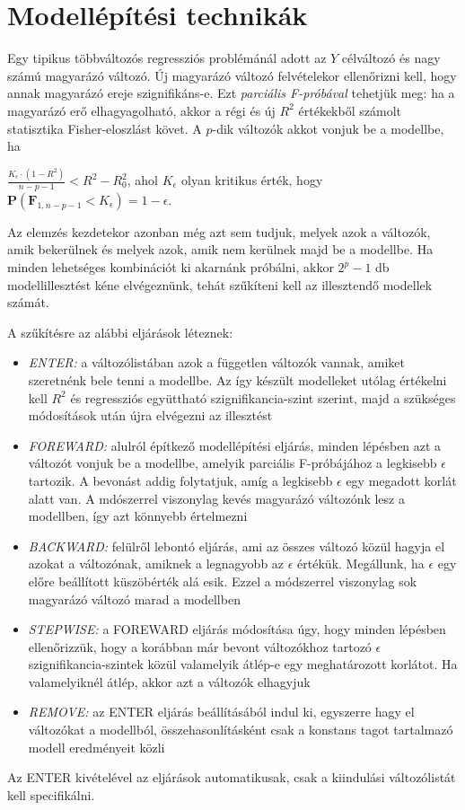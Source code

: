 \section{Modellépítési technikák}

Egy tipikus többváltozós regressziós problémánál adott az $Y$ célváltozó és nagy számú magyarázó változó. Új magyarázó változó felvételekor ellenőrizni kell, hogy annak magyarázó ereje szignifikáns-e. Ezt \emph{parciális F-próbával} tehetjük meg: ha a magyarázó erő elhagyagolható, akkor a régi és új $R^2$ értékekből számolt statisztika Fisher-eloszlást követ. A $p$-dik változók akkot vonjuk be a modellbe, ha

$\frac{K_\epsilon \cdot (1-R^2)}{n-p-1} < R^2 -R_0^2$, ahol $K_\epsilon$ olyan kritikus érték, hogy $\mathbf{P}(\mathbf{F}_{1,n-p-1} < K_\epsilon) = 1-\epsilon$.

Az elemzés kezdetekor azonban még azt sem tudjuk, melyek azok a változók, amik bekerülnek és melyek azok, amik nem kerülnek majd be a modellbe. Ha minden lehetséges kombinációt ki akarnánk próbálni, akkor $2^p-1$ db modellillesztést kéne elvégeznünk, tehát szűkíteni kell az illesztendő modellek számát.

A szűkítésre az alábbi eljárások léteznek:
\begin{itemize}
\item \emph{ENTER:} a változólistában azok a független változók vannak, amiket szeretnénk bele tenni a modellbe. Az így készült modelleket utólag értékelni kell $R^2$ és regressziós együttható szignifikancia-szint szerint, majd a szükséges módosítások után újra elvégezni az illesztést
\item \emph{FOREWARD:} alulról építkező modellépítési eljárás, minden lépésben azt a változót vonjuk be a modellbe, amelyik parciális F-próbájához a legkisebb $\epsilon$ tartozik. A bevonást addig folytatjuk, amíg a legkisebb $\epsilon$ egy megadott korlát alatt van. A mdószerrel viszonylag kevés magyarázó változónk lesz a modellben, így azt könnyebb értelmezni
\item \emph{BACKWARD:} felülről lebontó eljárás, ami az összes változó közül hagyja el azokat a változónak, amiknek a legnagyobb az $\epsilon$ értékük. Megállunk, ha $\epsilon$ egy előre beállított küszöbérték alá esik. Ezzel a módszerrel viszonylag sok magyarázó változó marad a modellben
\item \emph{STEPWISE:} a FOREWARD eljárás módosítása úgy, hogy minden lépésben ellenőrizzük, hogy a korábban már bevont változókhoz tartozó $\epsilon$ szignifikancia-szintek közül valamelyik átlép-e egy meghatározott korlátot. Ha valamelyiknél átlép, akkor azt a változók elhagyjuk
\item \emph{REMOVE:} az ENTER eljárás beállításából indul ki, egyszerre hagy el változókat a modellból, összehasonlításként csak a konstans tagot tartalmazó modell eredményeit közli
\end{itemize}
Az ENTER kivételével az eljárások automatikusak, csak a kiindulási változólistát kell specifikálni.

